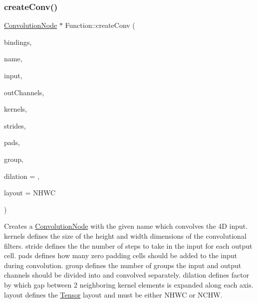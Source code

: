 \subsubsection{\texorpdfstring{create\+Conv()}{createConv()}\hspace{0.1cm}{\footnotesize\ttfamily [3/4]}}
{\footnotesize\ttfamily \hyperlink{classglow_1_1_convolution_node}{Convolution\+Node} $\ast$ Function\+::create\+Conv (\begin{DoxyParamCaption}\item[{\hyperlink{classglow_1_1_placeholder_bindings}{Placeholder\+Bindings} \&}]{bindings,  }\item[{llvm\+::\+String\+Ref}]{name,  }\item[{\hyperlink{structglow_1_1_node_value}{Node\+Value}}]{input,  }\item[{size\+\_\+t}]{out\+Channels,  }\item[{llvm\+::\+Array\+Ref$<$ \hyperlink{namespaceglow_a0ca574644e1e42ef193a9947fb4d8911}{unsigned\+\_\+t} $>$}]{kernels,  }\item[{llvm\+::\+Array\+Ref$<$ \hyperlink{namespaceglow_a0ca574644e1e42ef193a9947fb4d8911}{unsigned\+\_\+t} $>$}]{strides,  }\item[{llvm\+::\+Array\+Ref$<$ \hyperlink{namespaceglow_a0ca574644e1e42ef193a9947fb4d8911}{unsigned\+\_\+t} $>$}]{pads,  }\item[{\hyperlink{namespaceglow_a0ca574644e1e42ef193a9947fb4d8911}{unsigned\+\_\+t}}]{group,  }\item[{\hyperlink{namespaceglow_a0ca574644e1e42ef193a9947fb4d8911}{unsigned\+\_\+t}}]{dilation = {},  }\item[{\hyperlink{namespaceglow_aa2f3a33e05699df0f42295c5c4bd1f77}{Convolution\+Layout}}]{layout = {\ttfamily NHWC} }\end{DoxyParamCaption})}

Creates a \hyperlink{classglow_1_1_convolution_node}{Convolution\+Node} with the given {\ttfamily name} which convolves the 4D {\ttfamily input}. {\ttfamily kernels} defines the size of the height and width dimensions of the convolutional filters. {\ttfamily stride} defines the the number of steps to take in the input for each output cell. {\ttfamily pads} defines how many zero padding cells should be added to the input during convolution. {\ttfamily group} defines the number of groups the input and output channels should be divided into and convolved separately. {\ttfamily dilation} defines factor by which gap between 2 neighboring kernel elements is expanded along each axis. {\ttfamily layout} defines the \hyperlink{classglow_1_1_tensor}{Tensor} layout and must be either N\+H\+WC or N\+C\+HW. \mbox{\label{classglow_1_1_function_a9fce0de99a46d774b0f9bd9aa04b1498}} 
